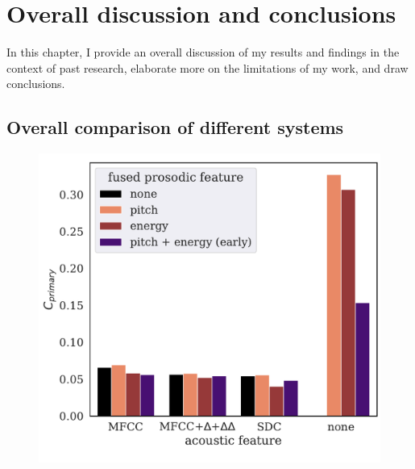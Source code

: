\documentclass[bsc,frontabs,twoside,singlespacing,parskip,deptreport]{infthesis}
\begin{document}
\chapter{Overall discussion and conclusions}{
  \label{chap:discussion-and-conclusions}

  In this chapter, I provide an overall discussion of my results and findings in the context of past research, elaborate more on the limitations of my work, and draw conclusions.

  \section{Overall comparison of different systems}{
    \label{sec:discussion-overall-comparison}
    \begin{figure}[h!t]
      \centering
      \begin{minipage}{0.49\textwidth}
        \centering
        \includegraphics[width=\textwidth]{../img/summary-early-10s.pdf}
        \label{fig:summary-early-10s}
      \end{minipage}
      \begin{minipage}{0.49\textwidth}
        \centering

\end{minipage}
\end{figure}}}
\end{document}
